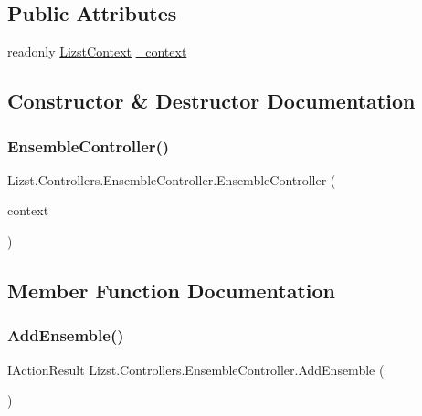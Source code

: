\subsection*{Public Attributes}
\begin{DoxyCompactItemize}
\item 
readonly \mbox{\hyperlink{class_lizst_1_1_models_1_1_lizst_context}{Lizst\+Context}} \mbox{\hyperlink{class_lizst_1_1_controllers_1_1_ensemble_controller_a00698052da9bcfaafa14a8cb6df966f9}{\+\_\+context}}
\end{DoxyCompactItemize}


\subsection{Constructor \& Destructor Documentation}
\mbox{\label{class_lizst_1_1_controllers_1_1_ensemble_controller_a7b7634158fb0807f47b13c9fb42fce73}} 
\subsubsection{\texorpdfstring{EnsembleController()}{EnsembleController()}}
{\footnotesize\ttfamily Lizst.\+Controllers.\+Ensemble\+Controller.\+Ensemble\+Controller (\begin{DoxyParamCaption}\item[{\mbox{\hyperlink{class_lizst_1_1_models_1_1_lizst_context}{Lizst\+Context}}}]{context }\end{DoxyParamCaption})}



\subsection{Member Function Documentation}
\mbox{\label{class_lizst_1_1_controllers_1_1_ensemble_controller_a94308622fb69be047dca1299ea6a640c}} 
\subsubsection{\texorpdfstring{AddEnsemble()}{AddEnsemble()}\hspace{0.1cm}{\footnotesize\ttfamily [1/2]}}
{\footnotesize\ttfamily I\+Action\+Result Lizst.\+Controllers.\+Ensemble\+Controller.\+Add\+Ensemble (\begin{DoxyParamCaption}{ }\end{DoxyParamCaption})}

